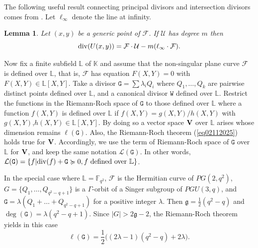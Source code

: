 \documentclass[9pt]{article}
\theoremstyle{plain}
\newtheorem{lem}[thm]{Lemma}
\begin{document}
The following useful result connecting principal divisors and intersection divisors comes from \cite[Theorem 6.2]{HKT}. Let $\ell_\infty$ denote the line at infinity.  
\begin{lem}
\label{theo6.2HKT} Let $(x,y)$ be a generic point of $\mathcal{F}$. If $\mathcal{U}$ has degree $m$ then 
$$
{\rm{div}}(U(x,y))=\mathcal{F}\cdot \mathcal{U}-m(\ell_{\infty}\cdot \mathcal{F}).
$$
\end{lem}
Now fix a finite subfield $\mathbb{L}$ of $\mathbb{K}$ and assume that the non-singular plane curve $\mathcal{F}$ is defined over $\mathbb{L}$, that is, $\mathcal F$ has equation $F(X,Y)=0$ with $F(X,Y)\in \mathbb{L}[X,Y]$. Take a divisor $\mathtt G=\sum \lambda_i Q_i$ where $Q_1,\ldots,Q_k$ are pairwise distinct points defined over  $\mathbb{L}$, and a canonical divisor $\mathtt{W}$ defined over $\mathbb{L}$. Restrict the functions in the Riemann-Roch space of $\mathtt{G}$ to those defined over $\mathbb{L}$ where a function $f(X,Y)$ is defined over $\mathbb{L}$ if $f(X,Y)=g(X,Y)/h(X,Y)$ with $g(X,Y)$,$h(X,Y)\in \mathbb{L}[X,Y]$. By doing so a vector space $\bf{V}$ over $\mathbb{L}$ arises whose dimension remains $\ell(\mathtt{G})$. Also, the Riemann-Roch theorem (\ref{eq02112025}) holds true for $\bf{V}$. Accordingly, we use the term of Riemann-Roch space of $\mathtt{G}$ over $\mathbb{L}$ for $\bf{V}$, and keep the same notation $\mathcal L(\mathtt G)$. In other words, $\mathcal L(\mathtt G)=\{f|{\rm{div}} (f)+\mathtt{G}\succcurlyeq 0, \mbox{$f$ defined over $\mathbb{L}$}\}$.

In the special case where $\mathbb{L}=\mathbb{F}_{q^2}$, $\mathcal{F}$ is the Hermitian curve of $PG(2,q^2)$, $G=\{Q_1,\ldots,Q_{q^2-q+1}\}$ is a $\Gamma$-orbit of a Singer subgroup of $PGU(3,q)$, and $\mathtt{G}=\lambda(Q_1+\ldots+Q_{q^2-q+1})$ for a positive integer $\lambda$. Then $\mathfrak{g}=\frac{1}{2}(q^2-q)$ and $\deg(\mathtt{G})=\lambda(q^2-q+1)$. Since $|G|>2\mathfrak{g}-2$, the Riemann-Roch theorem yields in this case
$$\ell(\mathtt G) =\textstyle{\frac{1}{2}}\big((2\lambda-1)(q^2-q)+2\lambda\big).$$




\end{document}
